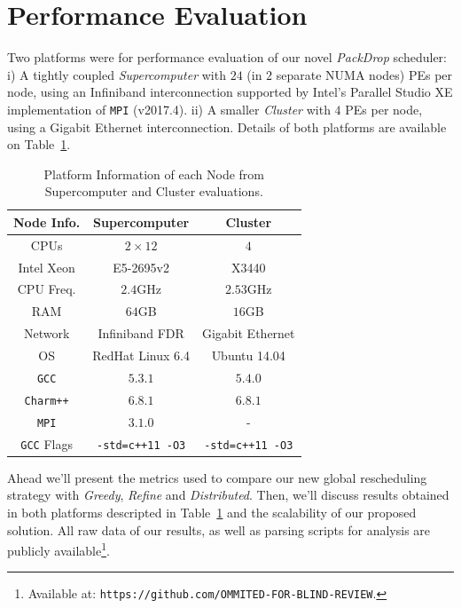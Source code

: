 \section{Performance Evaluation}

Two platforms were for performance evaluation of our novel \textit{PackDrop} scheduler:
i) A tightly coupled \textit{Supercomputer} with $24$ (in $2$ separate NUMA nodes) PEs per node, using an Infiniband interconnection supported by Intel's Parallel Studio XE implementation of \texttt{MPI} (v2017.4).
ii) A smaller \textit{Cluster} with $4$ PEs per node, using a Gigabit Ethernet interconnection.
Details of both platforms are available on Table~\ref{tab:ptinfo}.

\begin{table}[ht]
    \centering
	\begin{tabular}{c|c|c}
	Node Info.	 		& Supercomputer 		& Cluster \\ \hline
        CPUs	   			& $2\times12$ 			& $4$ \\
        Intel Xeon			& E5-2695v2 			& X3440\\
        CPU Freq.  			& $2.4$GHz   			& $2.53$GHz\\
        RAM        			& $64$GB			& $16$GB\\
        Network 			& Infiniband FDR 		& Gigabit Ethernet\\
        OS      			& RedHat Linux 6.4 		& Ubuntu 14.04\\
        \texttt{GCC}			& $5.3.1$			& $5.4.0$\\
        \texttt{Charm++} 		& $6.8.1$ 			& $6.8.1$\\
        \texttt{MPI}			& $3.1.0$			& -\\
        \texttt{GCC} Flags		& \texttt{-std=c++11 -O3} 	& \texttt{-std=c++11 -O3} \\
	\end{tabular}
    \caption{Platform Information of each Node from Supercomputer and Cluster evaluations.}
    \label{tab:ptinfo}
\end{table}

Ahead we'll present the metrics used to compare our new global rescheduling strategy with \textit{Greedy}, \textit{Refine} and \textit{Distributed}.
Then, we'll discuss results obtained in both platforms descripted in Table~\ref{tab:ptinfo} and the scalability of our proposed solution.
All raw data of our results, as well as parsing scripts for analysis are publicly available\footnote{Available at: \texttt{https://github.com/OMMITED-FOR-BLIND-REVIEW}.}.

